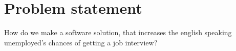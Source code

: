 \section{Problem statement}\label{sec:problem}
How do we make a software solution, that increases the english
speaking unemployed's chances of getting a job interview?
